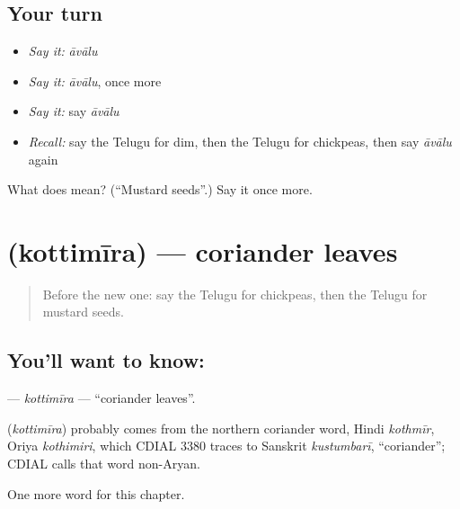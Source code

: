\subsection*{Your turn}
\begin{itemize}
\raggedright
  \item \emph{Say it:} \emph{āvālu}
  \item \emph{Say it:} \emph{āvālu}, once more
  \item \emph{Say it:} say \emph{āvālu}
  \item \emph{Recall:} say the Telugu for dim, then the Telugu for chickpeas, then say \emph{āvālu} again
\end{itemize}

\begin{tcolorbox}[breakable,colback=teal!4,colframe=teal!35!black,title={Before you move on}]
What does  mean? (\textquotedblleft{}Mustard seeds\textquotedblright{}.) Say it once more.
\end{tcolorbox}
\section[\texorpdfstring{\te{కొత్తిమీర} (kottimīra)}{కొత్తిమీర (kottimīra)}]{ (kottimīra) — coriander leaves}

\label{lesson:TE-C299-kottimira}



\begin{quote}
Before the new one: say the Telugu for chickpeas, then the Telugu for mustard seeds.
\end{quote}

\subsection*{You'll want to know: }
\textbf{} — \emph{kottimīra} — \textquotedblleft{}coriander leaves\textquotedblright{}.

\begin{cousinweb}
\textbf{} (\emph{kottimīra}) probably comes from the northern coriander word, Hindi \emph{kothmīr}, Oriya \emph{kothimiri}, which CDIAL 3380 traces to Sanskrit \emph{kustumbarī}, \textquotedblleft{}coriander\textquotedblright{}; CDIAL calls that word non-Aryan.
\end{cousinweb}

\begin{grammarlens}[title={What you've built}]
One more word for this chapter.
\end{grammarlens}

